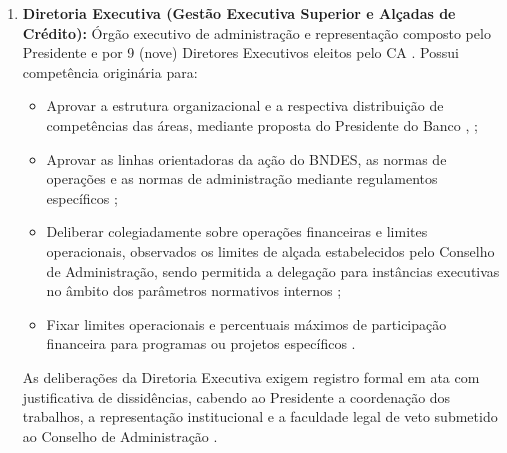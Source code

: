 \begin{enumerate}[label=\textbf{\alph*)}]
    \item \textbf{Diretoria Executiva (Gestão Executiva Superior e Alçadas de Crédito):} Órgão executivo de administração e representação composto pelo Presidente e por 9 (nove) Diretores Executivos eleitos pelo CA \cite[arts.~38 e 39]{bndes2025estatuto}. Possui competência originária para:
          \begin{itemize}
              \item Aprovar a estrutura organizacional e a respectiva distribuição de competências das áreas, mediante proposta do Presidente do Banco \cite[art.~78]{bndes2025estatuto}, \cite[p.~11, itens II.3 e II.4]{bndes2026oib};
              \item Aprovar as linhas orientadoras da ação do BNDES, as normas de operações e as normas de administração mediante regulamentos específicos \cite[art.~43,~II]{bndes2025estatuto};
              \item Deliberar colegiadamente sobre operações financeiras e limites operacionais, observados os limites de alçada estabelecidos pelo Conselho de Administração, sendo permitida a delegação para instâncias executivas no âmbito dos parâmetros normativos internos \cite[art.~43,~III e Parágrafo Único,~I]{bndes2025estatuto};
              \item Fixar limites operacionais e percentuais máximos de participação financeira para programas ou projetos específicos \cite[art.~7º,~Parágrafo Único]{bndes2025estatuto}.
          \end{itemize}
          As deliberações da Diretoria Executiva exigem registro formal em ata com justificativa de dissidências, cabendo ao Presidente a coordenação dos trabalhos, a representação institucional e a faculdade legal de veto submetido ao Conselho de Administração \cite[arts.~40 e 42]{bndes2025estatuto}.


\end{enumerate}
